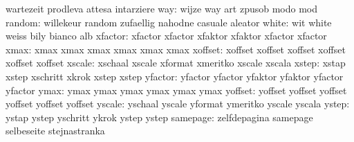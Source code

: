                            wartezeit                 prodleva
                           attesa                    intarziere
                      way: wijze                     way
                           art                       zpusob
                           modo                      mod
                   random: willekeur                 random
                           zufaellig                 nahodne
                           casuale                   aleator
                    white: wit                       white
                           weiss                     bily
                           bianco                    alb
                  xfactor: xfactor                   xfactor
                           xfaktor                   xfaktor
                           xfactor                   xfactor %
                     xmax: xmax                      xmax
                           xmax                      xmax
                           xmax                      xmax %
                  xoffset: xoffset                   xoffset
                           xoffset                   xoffset
                           xoffset                   xoffset %
                   xscale: xschaal                   xscale
                           xformat                   xmeritko
                           xscale                    xscala %
                    xstep: xstap                     xstep
                           xschritt                  xkrok
                           xstep                     xstep %
                  yfactor: yfactor                   yfactor
                           yfaktor                   yfaktor
                           yfactor                   yfactor %
                     ymax: ymax                      ymax
                           ymax                      ymax
                           ymax                      ymax %
                  yoffset: yoffset                   yoffset
                           yoffset                   yoffset
                           yoffset                   yoffset %
                   yscale: yschaal                   yscale
                           yformat                   ymeritko
                           yscale                    yscala %
                    ystep: ystap                     ystep
                           yschritt                  ykrok
                           ystep                     ystep %
                 samepage: zelfdepagina              samepage
                           selbeseite                stejnastranka
